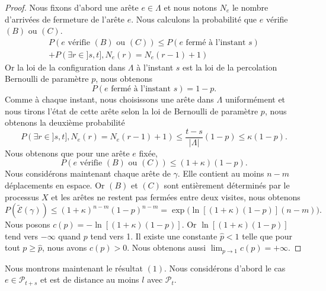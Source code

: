 \documentclass[titlepage,a4paper,12pt]{article}
\begin{document}
\begin{proof}
Nous fixons d'abord une arête $e\in \Lambda$ et nous notons $N_e$ le nombre d'arrivées de fermeture de l'arête $e$. Nous calculons la probabilité que $e$ vérifie $(B)$ ou $(C)$.
\begin{multline*}P(e \text{ vérifie }(B) \text{ ou }(C))\leqslant P(e \text{ fermé à l'instant } s)\\+P(\exists r \in ]s,t], N_e(r)=N_e(r-1)+1)
\end{multline*}
Or la loi de la configuration dans $\Lambda$ à l'instant $s$ est la loi de la percolation Bernoulli de paramètre $p$, nous obtenons $$P(e \text{ fermé à l'instant } s) = 1-p.$$
Comme à chaque instant, nous choisissons une arête dans $\Lambda$ uniformément et nous tirons l'état de cette arête selon la loi de Bernoulli de paramètre $p$, nous obtenons la deuxième probabilité
$$ P(\exists r \in ]s,t], N_e(r)=N_e(r-1)+1) \leqslant \frac{t-s}{|\Lambda|}(1-p)\leqslant \kappa(1-p).
$$
Nous obtenons que pour une arête $e$ fixée, $$P(e \text{ vérifie }(B) \text{ ou }(C))\leqslant (1+\kappa)(1-p).$$
Nous considérons maintenant chaque arête de $\gamma$. Elle contient au moins $n-m$ déplacements en espace. Or $(B)$ et $(C)$ sont entièrement déterminés par le processus $X$ et les arêtes ne restent pas fermées entre deux visites, nous obtenons 
$$P(\tilde{\mathcal{E}}(\gamma))\leqslant (1+\kappa)^{n-m}(1-p)^{n-m} = \exp\big(\ln[(1+\kappa)(1-p)](n-m)\big).
$$ 
Nous posons $c(p) = -\ln[(1+\kappa)(1-p)]$. Or $\ln[(1+\kappa)(1-p)]$ tend vers $-\infty$ quand $p$ tend vers 1. Il existe une constante $\hat{p}<1$ telle que pour tout $p\geqslant \hat{p}$, nous avons $c(p)>0$. Nous obtenons aussi 
$ \lim_{p\rightarrow 1}c(p) = +\infty
$.
\end{proof}
Nous montrons maintenant le résultat $(1)$. Nous considérons d'abord le cas $e\in \mathcal{P}_{t+s}$ et est de distance au moins $l$ avec $\mathcal{P}_t$.
\end{document}
